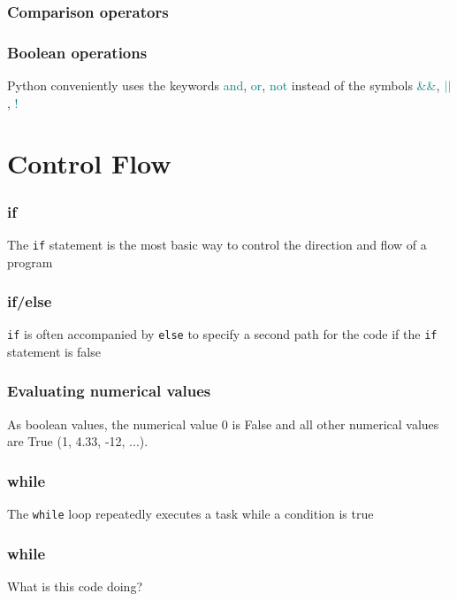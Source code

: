 \documentclass{beamer}
\begin{document}
\begin{frame}
\frametitle{Comparison operators}



\end{frame}

\begin{frame}
\frametitle{Boolean operations}



Python conveniently uses the keywords \textcolor{teal}{and}, \textcolor{teal}{or}, \textcolor{teal}{not} instead of the symbols \textcolor{teal}{\&\&}, $\textcolor{teal}{||}$, \textcolor{teal}{!}

\end{frame}

\section{Control Flow}
\begin{frame}
\frametitle{if}
The \texttt{if} statement is the most basic way to control the direction and flow of a program



\end{frame}


\begin{frame}
\frametitle{if/else}
\texttt{if} is often accompanied by \texttt{else} to specify a second path for the code if the \texttt{if} statement is false



\end{frame}

\begin{frame}
\frametitle{Evaluating numerical values}

As boolean values, the numerical value 0 is False and all other numerical values are True (1, 4.33, -12, ...).



\end{frame}

\begin{frame}
\frametitle{while}
The \texttt{while} loop repeatedly executes a task while a condition is true


\end{frame}

\begin{frame}
\frametitle{while}


What is this code doing?


\end{frame}
\end{document}
